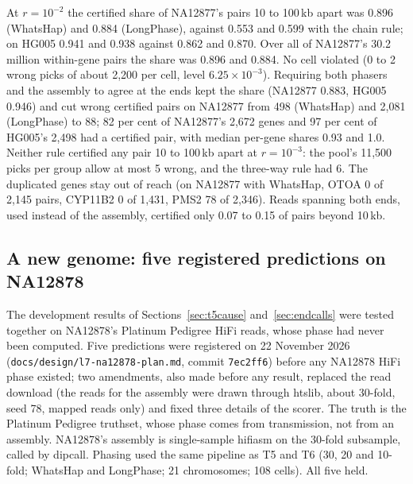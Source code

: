 \documentclass[11pt]{article}
\theoremstyle{definition}
\theoremstyle{remark}
\begin{document}
At $r=10^{-2}$ the certified share of NA12877's pairs 10 to 100\,kb apart
was 0.896 (WhatsHap) and 0.884 (LongPhase), against 0.553 and 0.599 with
the chain rule; on HG005 0.941 and 0.938 against 0.862 and 0.870. Over all
of NA12877's 30.2 million within-gene pairs the share was 0.896 and 0.884.
No cell violated (0 to 2 wrong picks of about 2{,}200 per cell, level
$6.25\times10^{-3}$). Requiring both phasers and the assembly to agree at the
ends kept the share (NA12877 0.883, HG005 0.946) and cut wrong certified
pairs on NA12877 from 498 (WhatsHap) and 2{,}081 (LongPhase) to 88; 82 per
cent of NA12877's 2{,}672 genes and 97 per cent of HG005's 2{,}498 had a
certified pair, with median per-gene shares 0.93 and 1.0. Neither rule
certified any pair 10 to 100\,kb apart at $r=10^{-3}$: the pool's 11{,}500
picks per group allow at most 5 wrong, and the three-way rule had 6. The
duplicated genes stay out of reach (on NA12877 with WhatsHap, OTOA 0 of
2{,}145 pairs, CYP11B2 0 of 1{,}431, PMS2 78 of 2{,}346). Reads spanning
both ends, used instead of the assembly, certified only 0.07 to 0.15 of
pairs beyond 10\,kb.

\subsection{A new genome: five registered predictions on NA12878}\label{sec:na12878}

The development results of Sections~\ref{sec:t5cause} and~\ref{sec:endcalls}
were tested together on NA12878's Platinum Pedigree HiFi reads, whose phase
had never been computed. Five predictions were registered on 22 November
2026 (\nolinkurl{docs/design/l7-na12878-plan.md}, commit \texttt{7ec2ff6})
before any NA12878 HiFi phase existed; two amendments, also made before any
result, replaced the read download (the reads for the assembly were drawn
through htslib, about 30-fold, seed 78, mapped reads only) and fixed three
details of the scorer. The truth is the Platinum Pedigree truthset, whose
phase comes from transmission, not from an assembly. NA12878's assembly is
single-sample hifiasm on the 30-fold subsample, called by dipcall. Phasing
used the same pipeline as T5 and T6 (30, 20 and 10-fold; WhatsHap and
LongPhase; 21 chromosomes; 108 cells). All five held.
\end{document}
